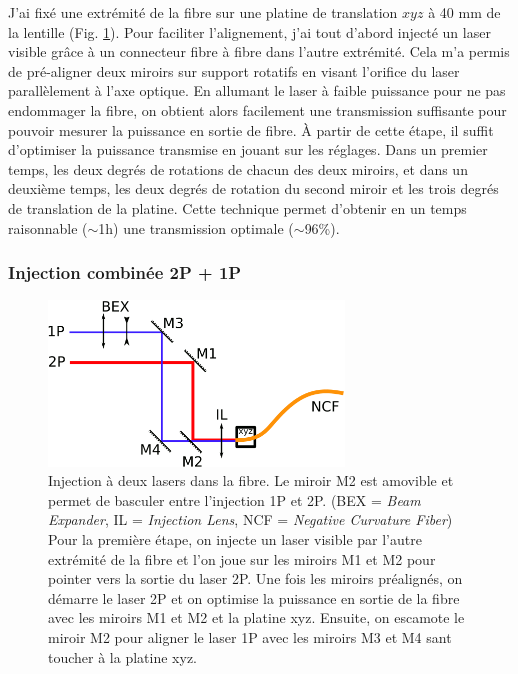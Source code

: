 
J'ai fixé une extrémité de la fibre sur une platine de translation $xyz$ à 40 mm de la lentille (Fig. \ref{FIGinjection}). Pour faciliter l'alignement, j'ai tout d'abord injecté un laser visible grâce à un connecteur fibre à fibre dans l'autre extrémité. Cela m'a permis de pré-aligner deux miroirs sur support rotatifs en visant l'orifice du laser parallèlement à l'axe optique. En allumant le laser à faible puissance pour ne pas endommager la fibre, on obtient alors facilement une transmission suffisante pour pouvoir mesurer la puissance en sortie de fibre. À partir de cette étape, il suffit d'optimiser la puissance transmise en jouant sur les réglages. Dans un premier temps, les deux degrés de rotations de chacun des deux miroirs, et dans un deuxième temps, les deux degrés de rotation du second miroir et les trois degrés de translation de la platine. Cette technique permet d'obtenir en un temps raisonnable ($\sim$1h) une transmission optimale ($\sim$96\%).

\subsubsection{Injection combinée 2P + 1P}

\begin{figure}
    \centering
    \includegraphics[width=0.7\textwidth]{./files/injection.svg.png}
    \caption{Injection à deux lasers dans la fibre. Le miroir M2 est amovible et permet de basculer entre l'injection 1P et 2P. (BEX = \emph{Beam Expander}, IL = \emph{Injection Lens}, NCF = \emph{Negative Curvature Fiber})
    \\ Pour la première étape, on injecte un laser visible par l'autre extrémité de la fibre et l'on joue sur les miroirs M1 et M2 pour pointer vers la sortie du laser 2P. Une fois les miroirs préalignés, on démarre le laser 2P et on optimise la puissance en sortie de la fibre avec les miroirs M1 et M2 et la platine xyz. Ensuite, on escamote le miroir M2 pour aligner le laser 1P avec les miroirs M3 et M4 sant toucher à la platine xyz.
    \label{FIGinjection}}
    \end{figure}

